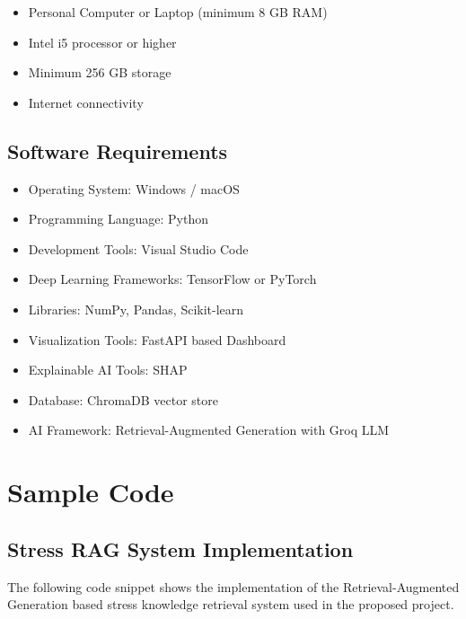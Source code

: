 \documentclass[12pt,a4paper]{report}
\begin{document}
\begin{itemize}
\item Personal Computer or Laptop (minimum 8 GB RAM)
\item Intel i5 processor or higher
\item Minimum 256 GB storage
\item Internet connectivity

\end{itemize}

\section{Software Requirements}

\begin{itemize}
\item Operating System: Windows / macOS
\item Programming Language: Python
\item Development Tools: Visual Studio Code
\item Deep Learning Frameworks: TensorFlow or PyTorch
\item Libraries: NumPy, Pandas, Scikit-learn
\item Visualization Tools: FastAPI based Dashboard
\item Explainable AI Tools: SHAP
\item Database: ChromaDB vector store
\item AI Framework: Retrieval-Augmented Generation with Groq LLM

\end{itemize}

\chapter{Sample Code}

\section{Stress RAG System Implementation}

The following code snippet shows the implementation of the Retrieval-Augmented Generation based stress knowledge retrieval system used in the proposed project.
\end{document}
